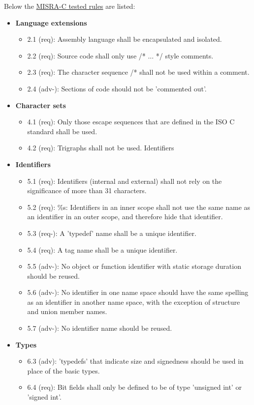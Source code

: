 Below the \underline{MISRA-C tested rules} are listed:
\begin{itemize}
\item \textbf{Language extensions}
\begin{itemize}
\item 2.1 (req): Assembly language shall be encapsulated and isolated.
\item 2.2 (req): Source code shall only use /* ... */ style comments.
\item 2.3 (req): The character sequence /* shall not be used within a comment.
\item 2.4 (adv-): Sections of code should not be 'commented out'.
\end{itemize}
\item \textbf{Character sets}
\begin{itemize}
\item 4.1 (req): Only those escape sequences that are defined in the ISO C standard shall be used.
\item 4.2 (req): Trigraphs shall not be used.
Identifiers
\end{itemize}
\item \textbf{Identifiers}
\begin{itemize}
\item 5.1 (req): Identifiers (internal and external) shall not rely on the significance of more than 31 characters.
\item 5.2 (req): \%s: Identifiers in an inner scope shall not use the same name as an identifier in an outer scope, and therefore hide that identifier.
\item 5.3 (req-): A 'typedef' name shall be a unique identifier.
\item 5.4 (req): A tag name shall be a unique identifier.
\item 5.5 (adv-): No object or function identifier with static storage duration should be reused.
\item 5.6 (adv-): No identifier in one name space should have the same spelling as an identifier in another name space, with the exception of structure and union member names.
\item 5.7 (adv-): No identifier name should be reused.
\end{itemize}
\item \textbf{Types}
\begin{itemize}
\item 6.3 (adv): 'typedefs' that indicate size and signedness should be used in place of the basic types.
\item 6.4 (req): Bit fields shall only be defined to be of type 'unsigned int' or 'signed int'.

\end{itemize}
\end{itemize}
